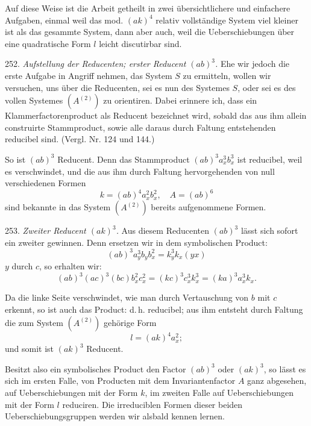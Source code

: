 Auf diese Weise ist die Arbeit getheilt in zwei übersichtlichere und
einfachere Aufgaben, einmal weil das mod. $(ak)^4$ relativ vollständige
System viel kleiner ist als das gesammte System, dann aber auch, weil
die Ueberschiebungen über eine quadratische Form $l$ leicht discutirbar
sind.

252. \textit{Aufstellung der Reducenten; erster Reducent $(ab)^3$.} Ehe
wir jedoch die erste Aufgabe in Angriff nehmen, das System $S$ zu
ermitteln, wollen wir versuchen, uns über die Reducenten, sei es nun des
Systemes $S$, oder sei es des vollen Systemes $(A^{(2)})$ zu orientiren.
Dabei erinnere ich, dass ein Klammerfactorenproduct als Reducent
bezeichnet wird, sobald das aus ihm allein construirte Stammproduct,
sowie alle daraus durch Faltung entstehenden reducibel sind. (Vergl.
Nr. 124 und 144.)

So ist $(ab)^3$ Reducent. Denn das Stammproduct $(ab)^3 a_x^3 b_x^3$ ist
reducibel, weil es verschwindet, und die aus ihm durch Faltung
hervorgehenden von null verschiedenen Formen
\[
k = (ab)^4 a_x^2 b_x^2,\quad A = (ab)^6
\]
sind bekannte in das System $(A^{(2)})$ bereits aufgenommene Formen.

253. \textit{Zweiter Reducent $(ak)^3$.} Aus diesem Reducenten $(ab)^3$
lässt sich sofort ein zweiter gewinnen. Denn ersetzen wir in dem
symbolischen Product:
\[
(ab)^3 a_y^3 b_y b_x^2 = k_y^3 k_x (yx)
\]
$y$ durch $c$, so erhalten wir:
\[
(ab)^3(ac)^3(bc) b_x^2 c_x^2 = (kc)^3 c_x^3 k_x^3 = (ka)^3 a_x^3 k_x .
\]



Da die linke Seite verschwindet, wie man durch Vertauschung von $b$ mit $c$
erkennt, so ist auch das Product:
d.\,h. reducibel; aus ihm entsteht durch Faltung die zum System $(A^{(2)})$
gehörige Form
\[
l = (ak)^4 a_x^2 ;
\]
und somit ist $(ak)^3$ Reducent.

Besitzt also ein symbolisches Product den Factor $(ab)^3$ oder $(ak)^3$,
so lässt es sich im ersten Falle, von Producten mit dem Invariantenfactor
$A$ ganz abgesehen, auf Ueberschiebungen mit der Form $k$, im zweiten
Falle auf Ueberschiebungen mit der Form $l$ reduciren. Die irreduciblen
Formen dieser beiden Ueberschiebungsgruppen werden wir alsbald kennen
lernen.

